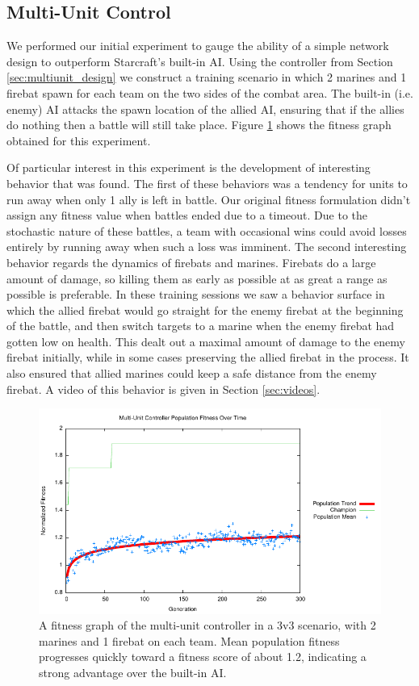 \documentclass[a4paper]{article}
\begin{document}
\subsection{Multi-Unit Control}
\label{sec:multiunit_exp}

We performed our initial experiment to gauge the ability of a simple network design to outperform Starcraft's built-in AI. Using the controller from Section \ref{sec:multiunit_design} we construct a training scenario in which 2 marines and 1 firebat spawn for each team on the two sides of the combat area. The built-in (i.e. enemy) AI attacks the spawn location of the allied AI, ensuring that if the allies do nothing then a battle will still take place. Figure \ref{fig:multiunit_exp} shows the fitness graph obtained for this experiment.

Of particular interest in this experiment is the development of interesting behavior that was found. The first of these behaviors was a tendency for units to run away when only 1 ally is left in battle. Our original fitness formulation didn't assign any fitness value when battles ended due to a timeout. Due to the stochastic nature of these battles, a team with occasional wins could avoid losses entirely by running away when such a loss was imminent. The second interesting behavior regards the dynamics of firebats and marines. Firebats do a large amount of damage, so killing them as early as possible at as great a range as possible is preferable. In these training sessions we saw a behavior surface in which the allied firebat would go straight for the enemy firebat at the beginning of the battle, and then switch targets to a marine when the enemy firebat had gotten low on health. This dealt out a maximal amount of damage to the enemy firebat initially, while in some cases preserving the allied firebat in the process. It also ensured that allied marines could keep a safe distance from the enemy firebat. A video of this behavior is given in Section \ref{sec:videos}.

\begin{figure}
\centering
\includegraphics[scale=1.1]{plots/multiunit.pdf}
\caption{A fitness graph of the multi-unit controller in a 3v3 scenario, with 2 marines and 1 firebat on each team. Mean population fitness progresses quickly toward a fitness score of about 1.2, indicating a strong advantage over the built-in AI.}
\label{fig:multiunit_exp}
\end{figure}
\end{document}

